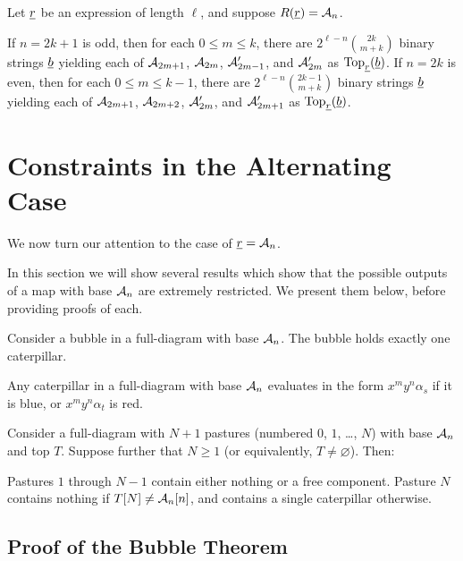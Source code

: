 \begin{theorem}
	Let $\ul r$ be an expression of length $\ell$, and suppose $R(\ul r) = \AA_n$.
	\begin{enumerate}
		\ii If $n=2k+1$ is odd, then for each $0 \le m \le k$, there are $2^{\ell-n} \binom{2k}{m+k}$ binary strings $\ul b$ yielding each of $\AA_{2m+1}$, $\AA_{2m}$, $\AA_{2m-1}'$, and $\AA_{2m}'$ as $\Top_{\ul r}(\ul b)$.
		\ii If $n=2k$ is even, then for each $0 \le m \le k-1$, there are $2^{\ell-n} \binom{2k-1}{m+k}$ binary strings $\ul b$ yielding each of $\AA_{2m+1}$, $\AA_{2m+2}$, $\AA_{2m}'$, and $\AA_{2m+1}'$ as $\Top_{\ul r}(\ul b)$.
	\end{enumerate}
\end{theorem}


\section{Constraints in the Alternating Case}
We now turn our attention to the case of $\ul r = \AA_n$.

In this section we will show several results which show that the possible outputs of a map with base $\AA_n$ are extremely restricted.  We present them below, before providing proofs of each.
\begin{theorem}
	Consider a bubble in a full-diagram with base $\AA_n$.  The bubble holds exactly one caterpillar.
	\label{thm:bubble}
\end{theorem}
\begin{theorem}
	Any caterpillar in a full-diagram with base $\AA_n$ evaluates in the form $x^my^n\alpha_s$ if it is blue, or $x^my^n\alpha_t$ is red.
	\label{thm:caterpillar}
\end{theorem}
\begin{theorem}
	Consider a full-diagram with $N+1$ pastures (numbered $0$, $1$, \dots, $N$) with base $\AA_n$ and top $T$.  Suppose further that $N \ge 1$ (or equivalently, $T \neq \varnothing$).  Then:
	\begin{enumerate}[(i)]
		\ii Pastures $1$ through $N-1$ contain either nothing or a free component.
		\ii Pasture $N$ contains nothing if $T[N] \neq \AA_n[n]$, and contains a single caterpillar otherwise.
	\end{enumerate}
	\label{thm:pasture}
\end{theorem}

\subsection{Proof of the Bubble Theorem}


